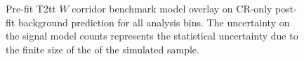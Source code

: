 \begin{figure}[h!]
\begin{center}
{            \label{fig:T2tt_Wcorridor_MR_4j}
        } \\
         ~~
         \\
        \caption{
            Pre-fit T2tt $W$ corridor benchmark model overlay on CR-only
            post-fit background prediction for all analysis bins. The
            uncertainty on the signal model counts represents the statistical
            uncertainty due to the finite size of the of the simulated sample.
        }
        \label{fig:T2tt_Wcorridor_MR}
    \end{center}
\end{figure}

